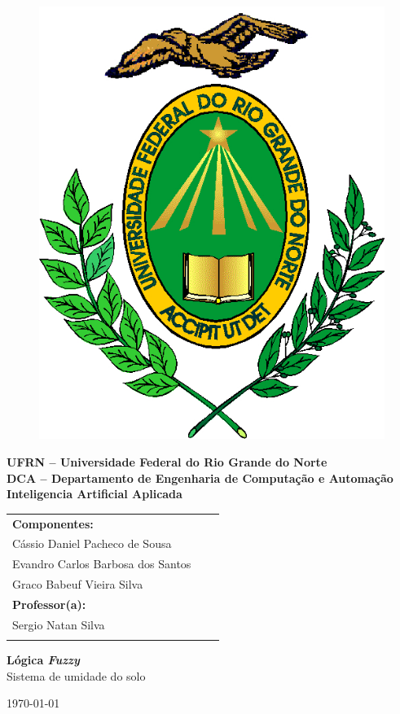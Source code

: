 	\begin{titlepage}
		
		\begin{figure}[t]
			\centering
			\includegraphics[width=0.1\linewidth]{Capa/Figuras/LOGO}
			\label{fig:LOGO}
		\end{figure}

		
		
		\begin{center}
			\textbf{UFRN – Universidade Federal do Rio Grande do Norte\\
				DCA – Departamento de Engenharia de Computação e Automação\\
				Inteligencia Artificial Aplicada
					}
		\end{center}
		
		\vspace{1.5 cm}
		
		\begin{tabular}{l l l}
			
			\textbf{Componentes:} \\
				
			Cássio Daniel Pacheco de Sousa \\
			Evandro Carlos Barbosa dos Santos \\
			Graco Babeuf Vieira Silva \\
			
		
			\textbf{Professor(a):}\\
			Sergio Natan Silva\\
			\vspace{4 cm}
			
		\end{tabular}
		
		\begin{center}
			{\textbf{\huge Lógica \textit{Fuzzy}}}\\
			{\large{Sistema de umidade do solo}}\\
		\end{center}
		
		\vspace{6cm}
		\begin{center}
			\today
		\end{center}
		
	\end{titlepage}